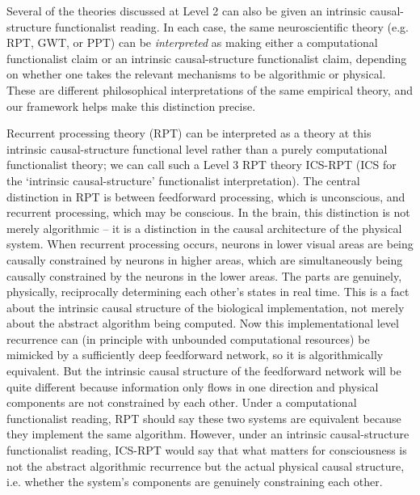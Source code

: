 \documentclass[11pt, a4paper, onecolumn, gdm]{google}
\begin{document}
Several of the theories discussed at Level 2 can also be given an intrinsic causal-structure functionalist reading.
In each case, the same neuroscientific theory (e.g. RPT, GWT, or PPT) can be \emph{interpreted} as making either a computational functionalist claim or an intrinsic causal-structure functionalist claim, depending on whether one takes the relevant mechanisms to be algorithmic or physical.
These are different philosophical interpretations of the same empirical theory, and our framework helps make this distinction precise.

Recurrent processing theory (RPT) can be interpreted as a theory at this intrinsic causal-structure functional level rather than a purely computational functionalist theory; we can call such a Level 3 RPT theory ICS-RPT (ICS for the `intrinsic causal-structure' functionalist interpretation).
The central distinction in RPT is between feedforward processing, which is unconscious, and recurrent processing, which may be conscious.
In the brain, this distinction is not merely algorithmic -- it is a distinction in the causal architecture of the physical system.
When recurrent processing occurs, neurons in lower visual areas are being causally constrained by neurons in higher areas, which are simultaneously being causally constrained by the neurons in the lower areas.
The parts are genuinely, physically, reciprocally determining each other's states in real time.
This is a fact about the intrinsic causal structure of the biological implementation, not merely about the abstract algorithm being computed.
Now this implementational level recurrence can (in principle with unbounded computational resources) be mimicked by a sufficiently deep feedforward network, so it is algorithmically equivalent.
But the intrinsic causal structure of the feedforward network will be quite different because information only flows in one direction and physical components are not constrained by each other.
Under a computational functionalist reading, RPT should say these two systems are equivalent because they implement the same algorithm.
However, under an intrinsic causal-structure functionalist reading, ICS-RPT would say that what matters for consciousness is not the abstract algorithmic recurrence but the actual physical causal structure, i.e. whether the system's components are genuinely constraining each other.
\end{document}
